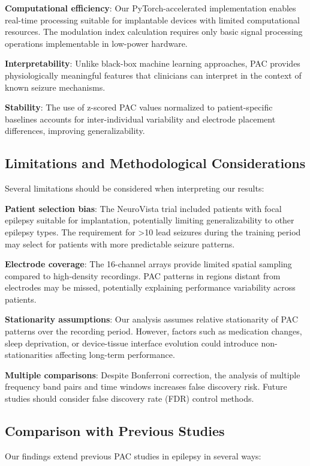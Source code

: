 \textbf{Computational efficiency}: Our PyTorch-accelerated implementation enables real-time processing suitable for implantable devices with limited computational resources. The modulation index calculation requires only basic signal processing operations implementable in low-power hardware.

\textbf{Interpretability}: Unlike black-box machine learning approaches, PAC provides physiologically meaningful features that clinicians can interpret in the context of known seizure mechanisms.

\textbf{Stability}: The use of z-scored PAC values normalized to patient-specific baselines accounts for inter-individual variability and electrode placement differences, improving generalizability.

\subsection{Limitations and Methodological Considerations}

Several limitations should be considered when interpreting our results:

\textbf{Patient selection bias}: The NeuroVista trial included patients with focal epilepsy suitable for implantation, potentially limiting generalizability to other epilepsy types. The requirement for >10 lead seizures during the training period may select for patients with more predictable seizure patterns.

\textbf{Electrode coverage}: The 16-channel arrays provide limited spatial sampling compared to high-density recordings. PAC patterns in regions distant from electrodes may be missed, potentially explaining performance variability across patients.

\textbf{Stationarity assumptions}: Our analysis assumes relative stationarity of PAC patterns over the recording period. However, factors such as medication changes, sleep deprivation, or device-tissue interface evolution could introduce non-stationarities affecting long-term performance.

\textbf{Multiple comparisons}: Despite Bonferroni correction, the analysis of multiple frequency band pairs and time windows increases false discovery risk. Future studies should consider false discovery rate (FDR) control methods.

\subsection{Comparison with Previous Studies}
Our findings extend previous PAC studies in epilepsy in several ways:

